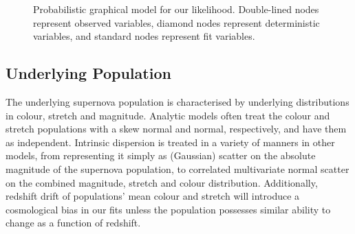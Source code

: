 \documentclass[a4paper,fleqn,usenatbib]{mnras}
\begin{document}
\begin{figure}
\caption{Probabilistic graphical model for our likelihood. Double-lined nodes represent observed variables, diamond nodes represent deterministic variables, and standard nodes represent fit variables.}
\label{fig:pgm}
\end{figure}


\subsection{Underlying Population}

The underlying supernova population is characterised by underlying distributions in colour, stretch and magnitude. Analytic models often treat the colour and stretch populations with a skew normal and normal, respectively, and have them as independent. Intrinsic dispersion is treated in a variety of manners in other models, from representing it simply as (Gaussian) scatter on the absolute magnitude of the supernova population, to correlated multivariate normal scatter on the combined magnitude, stretch and colour distribution. Additionally, redshift drift of populations' mean colour and stretch will introduce a cosmological bias in our fits unless the population possesses similar ability to change as a function of redshift. 
\end{document}
